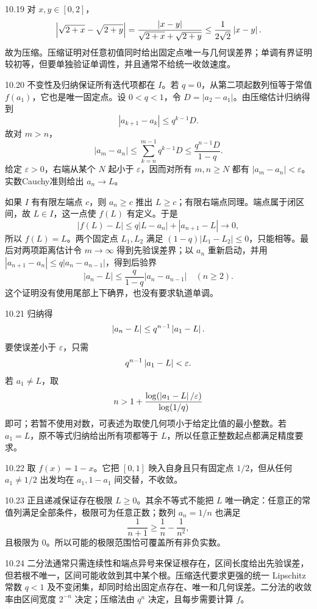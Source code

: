 \begin{solution}{10.19}
对 \(x,y\in[0,2]\)，
\[
 \left|\sqrt{2+x}-\sqrt{2+y}\right|
 =\frac{\left|x-y\right|}{\sqrt{2+x}+\sqrt{2+y}}
 \le\frac1{2\sqrt2}\left|x-y\right|.
\]
故为压缩。压缩证明对任意初值同时给出固定点唯一与几何误差界；单调有界证明较初等，但要单独验证单调性，并且通常不给统一收敛速度。
\end{solution}

\begin{solution}{10.20}
不变性及归纳保证所有迭代项都在 \(I\)。若 \(q=0\)，从第二项起数列恒等于常值 \(f(a_1)\)，它也是唯一固定点。设 \(0<q<1\)，令 \(D=|a_2-a_1|\)。由压缩估计归纳得到
\[
 |a_{k+1}-a_k|\le q^{k-1}D.
\]
故对 \(m>n\)，
\[
 |a_m-a_n|\le\sum_{k=n}^{m-1}q^{k-1}D
 \le\frac{q^{n-1}D}{1-q}.
\]
给定 \(\varepsilon>0\)，右端从某个 \(N\) 起小于 \(\varepsilon\)，因而对所有 \(m,n\ge N\) 都有 \(|a_m-a_n|<\varepsilon\)。实数Cauchy准则给出 \(a_n\to L\)。

如果 \(I\) 有有限左端点 \(c\)，则 \(a_n\ge c\) 推出 \(L\ge c\)；有限右端点同理。端点属于闭区间，故 \(L\in I\)，这一点使 \(f(L)\) 有定义。于是
\[
 |f(L)-L|\le q|L-a_n|+|a_{n+1}-L|\longrightarrow0,
\]
所以 \(f(L)=L\)。两个固定点 \(L_1,L_2\) 满足
\((1-q)|L_1-L_2|\le0\)，只能相等。最后对两项距离估计令 \(m\to\infty\) 得到先验误差界；以 \(a_n\) 重新启动，并用
\(|a_{n+1}-a_n|\le q|a_n-a_{n-1}|\)，得到后验界
\[
 |a_n-L|\le\frac{q}{1-q}|a_n-a_{n-1}|\quad(n\ge2).
\]
这个证明没有使用尾部上下确界，也没有要求轨道单调。
\end{solution}

\begin{solution}{10.21}
归纳得
\[
 \left|a_n-L\right|\le q^{n-1}\left|a_1-L\right|.
\]
要使误差小于 \(\varepsilon\)，只需
\[
 q^{n-1}\left|a_1-L\right|<\varepsilon.
\]
若 \(a_1\ne L\)，取
\[
 n>1+\frac{\log(\left|a_1-L\right|/\varepsilon)}{\log(1/q)}
\]
即可；若暂不使用对数，可表述为取使几何项小于给定比值的最小整数。若 \(a_1=L\)，原不等式归纳给出所有项都等于 \(L\)，所以任意正整数起点都满足精度要求。
\end{solution}

\begin{solution}{10.22}
取 \(f(x)=1-x\)。它把 \([0,1]\) 映入自身且只有固定点 \(1/2\)，但从任何 \(a_1\ne1/2\) 出发均在 \(a_1,1-a_1\) 间交替，不收敛。
\end{solution}

\begin{solution}{10.23}
正且递减保证存在极限 \(L\ge0\)。其余不等式不能把 \(L\) 唯一确定：任意正的常值列满足全部条件，极限可为任意正数；数列 \(a_n=1/n\) 也满足
\[
 \frac1{n+1}\ge\frac1n-\frac1{n^2},
\]
且极限为 \(0\)。所以可能的极限范围恰可覆盖所有非负实数。
\end{solution}

\begin{solution}{10.24}
二分法通常只需连续性和端点异号来保证根存在，区间长度给出先验误差，但若根不唯一，区间可能收敛到其中某个根。压缩迭代要求更强的统一 Lipschitz 常数 \(q<1\) 及不变闭集，却同时给出固定点存在、唯一和几何误差。二分法的收敛率由区间宽度 \(2^{-n}\) 决定；压缩法由 \(q^n\) 决定，且每步需要计算 \(f\)。
\end{solution}
